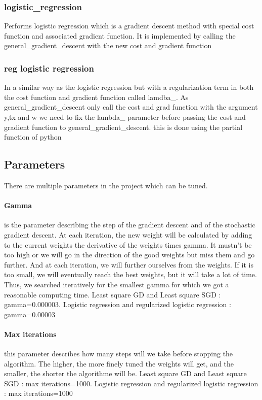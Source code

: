 \documentclass[10pt,conference,compsocconf]{IEEEtran}
\begin{document}
\subsubsection{logistic\_regression}
Performs logistic regression which is a gradient descent method with special cost function and associated gradient function. It is implemented by calling the general\_gradient\_descent with the new cost and gradient function 

\subsubsection{reg logistic regression}
In a similar way as the logistic regression but with a regularization term in both the cost function and gradient function called lamdba\_. As general\_gradient\_descent only call the cost and grad function with the argument y,tx and w we need to fix the lambda\_ parameter before passing the cost and gradient function to general\_gradient\_descent. this is done using the partial function of python

\subsection{Parameters}
There are multiple parameters in the project which can be tuned. 
\paragraph{Gamma} is the parameter describing the step of the gradient descent and of the stochastic gradient descent. At each iteration, the new weight will be calculated by adding to the current weights the derivative of the weights times gamma. It mustn’t be too high or we will go in the direction of the good weights but miss them and go further. And at each iteration, we will further ourselves from the weights. If it is too small, we will eventually reach the best weights, but it will take a lot of time. Thus, we searched iteratively for the smallest gamma for which we got a reasonable computing time.
Least square GD and Least square SGD : gamma=0.000003.
Logistic regression and regularized logistic regression : gamma=0.00003
\paragraph{Max iterations} this parameter describes how many steps will we take before stopping the algorithm. The higher, the more finely tuned the weights will get, and the smaller, the shorter the algorithme will be. 
Least square GD and Least square SGD : max iterations=1000.
Logistic regression and regularized logistic regression :  max iterations=1000
\end{document}
